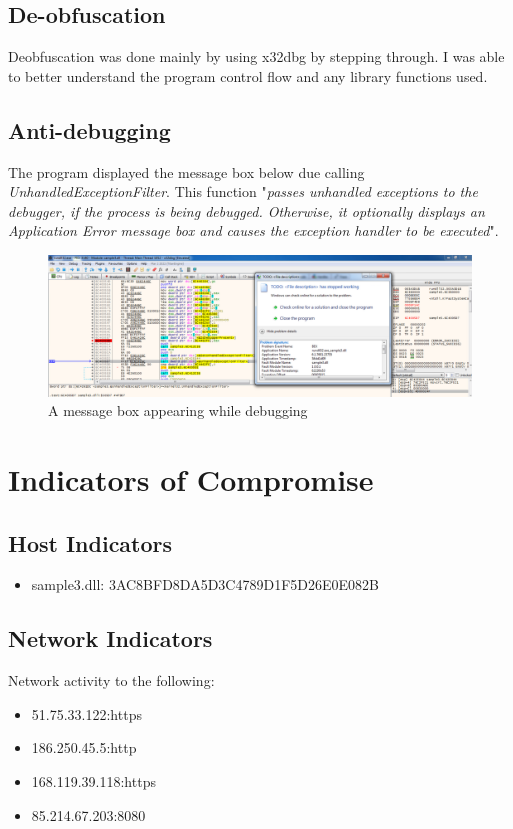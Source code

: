 \documentclass{article}
\begin{document}
    \subsection{De-obfuscation}
    Deobfuscation was done mainly by using x32dbg by stepping through. I was able to better understand the program control flow and any library functions used. 
    \subsection{Anti-debugging}
    The program displayed the message box below due calling \textit{UnhandledExceptionFilter}. This function "\textit{passes unhandled exceptions to the debugger, if the process is being debugged. Otherwise, it optionally displays an Application Error message box and causes the exception handler to be executed}"\Cite{unhandledFilter}.
    \begin{figure}[H]
        \includegraphics[width=\textwidth]{mesgbox2.png}
        \caption{A message box appearing while debugging}
    \end{figure}
    \pagebreak
    \section{Indicators of Compromise}
    \subsection{Host Indicators}
    \begin{itemize}
        \item sample3.dll: 3AC8BFD8DA5D3C4789D1F5D26E0E082B
    \end{itemize}
    \subsection{Network Indicators}
    Network activity to the following:
    \begin{itemize}
        \item 51.75.33.122:https
        \item 186.250.45.5:http
        \item 168.119.39.118:https
        \item 85.214.67.203:8080
    \end{itemize}
\end{document}
